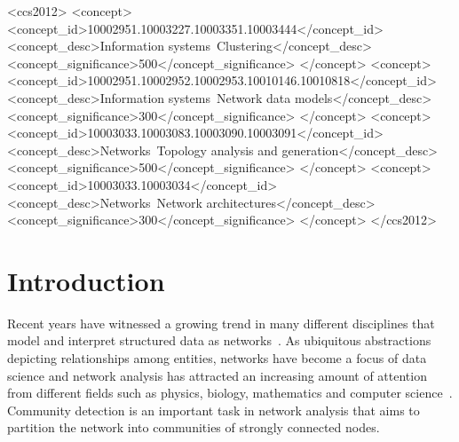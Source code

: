 \documentclass[sigconf]{acmart}
\begin{document}
\begin{CCSXML}
<ccs2012>
<concept>
<concept_id>10002951.10003227.10003351.10003444</concept_id>
<concept_desc>Information systems~Clustering</concept_desc>
<concept_significance>500</concept_significance>
</concept>
<concept>
<concept_id>10002951.10002952.10002953.10010146.10010818</concept_id>
<concept_desc>Information systems~Network data models</concept_desc>
<concept_significance>300</concept_significance>
</concept>
<concept>
<concept_id>10003033.10003083.10003090.10003091</concept_id>
<concept_desc>Networks~Topology analysis and generation</concept_desc>
<concept_significance>500</concept_significance>
</concept>
<concept>
<concept_id>10003033.10003034</concept_id>
<concept_desc>Networks~Network architectures</concept_desc>
<concept_significance>300</concept_significance>
</concept>
</ccs2012>
\end{CCSXML}





\maketitle

\section{Introduction}
\label{sec:intro}


Recent years have witnessed a growing trend in many different disciplines that model and interpret structured data as networks~\cite{Aggarwal2010Managing,DBLP:journals/pr/LiWLL18}. As ubiquitous abstractions depicting relationships among entities, networks have become a focus of data science and network analysis has attracted an increasing amount of attention from different fields such as physics, biology, mathematics and computer science~\cite{newman2004detecting,newman2006modularity,DBLP:conf/bibm/HuangWC18}. Community detection is an important task in network analysis that aims to partition the network into communities of strongly connected nodes.
\end{document}
